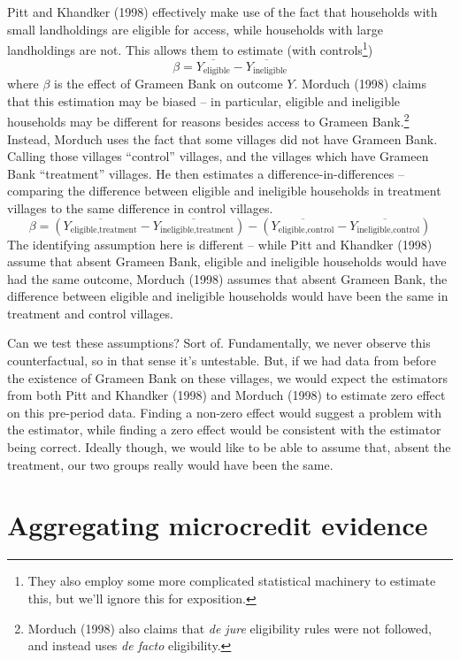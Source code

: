 \documentclass[12pt,english]{article}
\begin{document}
Pitt and Khandker (1998) effectively make use of the fact that households with small landholdings are eligible for access, while households with large landholdings are not. This allows them to estimate (with controls\footnote{They also employ some more complicated statistical machinery to estimate this, but we'll ignore this for exposition.})
$$ \beta = \overline{Y_{\text{eligible}}} - \overline{Y_{\text{ineligible}}} $$
where $\beta$ is the effect of Grameen Bank on outcome $Y$. Morduch (1998) claims that this estimation may be biased -- in particular, eligible and ineligible households may be different for reasons besides access to Grameen Bank.\footnote{Morduch (1998) also claims that \textit{de jure} eligibility rules were not followed, and instead uses \textit{de facto} eligibility.} Instead, 
Morduch uses the fact that some villages did not have Grameen Bank. Calling those villages ``control'' villages, and the villages which have Grameen Bank ``treatment'' villages. He then estimates a difference-in-differences -- comparing the difference between eligible and ineligible households in treatment villages to the same difference in control villages.
$$ \beta = (\overline{Y_{\text{eligible,treatment}}} - \overline{Y_{\text{ineligible,treatment}}}) - (\overline{Y_{\text{eligible,control}}} - \overline{Y_{\text{ineligible,control}}}) $$
The identifying assumption here is different -- while Pitt and Khandker (1998) assume that absent Grameen Bank, eligible and ineligible households would have had the same outcome, Morduch (1998) assumes that absent Grameen Bank, the difference between eligible and ineligible households would have been the same in treatment and control villages.

Can we test these assumptions? Sort of. Fundamentally, we never observe this counterfactual, so in that sense it's untestable. But, if we had data from before the existence of Grameen Bank on these villages, we would expect the estimators from both Pitt and Khandker (1998) and Morduch (1998) to estimate zero effect on this pre-period data. Finding a non-zero effect would suggest a problem with the estimator, while finding a zero effect would be consistent with the estimator being correct. Ideally though, we would like to be able to assume that, absent the treatment, our two groups really would have been the same.

\section{Aggregating microcredit evidence}
\end{document}
